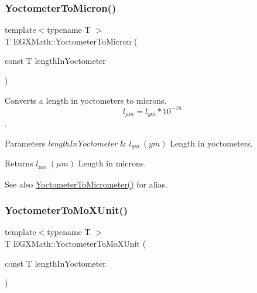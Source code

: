 \subsubsection{\texorpdfstring{Yoctometer\+To\+Micron()}{YoctometerToMicron()}}
{\footnotesize\ttfamily template$<$typename T $>$ \\
T E\+G\+X\+Math\+::\+Yoctometer\+To\+Micron (\begin{DoxyParamCaption}\item[{const T}]{length\+In\+Yoctometer }\end{DoxyParamCaption})}



Converts a length in yoctometers to microns. \[ l_{\mu m}=l_{ym} * 10^{-18} \]. 


\begin{DoxyParams}{Parameters}
{\em length\+In\+Yoctometer} & $ l_{ym}\ (ym)$ Length in yoctometers. \\
\hline
\end{DoxyParams}
\begin{DoxyReturn}{Returns}
$ l_{\mu m}\ (\mu m)$ Length in microns. 
\end{DoxyReturn}
\begin{DoxySeeAlso}{See also}
\mbox{\hyperlink{group___e_g_x_math-_conversions-_length_conversions-_yoctometer-_s_i_ga910145f68803fbaa87afd1d30d48c96e}{Yoctometer\+To\+Micrometer()}} for alias. 
\end{DoxySeeAlso}
\mbox{\label{group___e_g_x_math-_conversions-_length_conversions-_yoctometer-_non-_s_i_ga6a6a1fb3ecc97e377fc728c03327048e}} 
\subsubsection{\texorpdfstring{Yoctometer\+To\+Mo\+X\+Unit()}{YoctometerToMoXUnit()}}
{\footnotesize\ttfamily template$<$typename T $>$ \\
T E\+G\+X\+Math\+::\+Yoctometer\+To\+Mo\+X\+Unit (\begin{DoxyParamCaption}\item[{const T}]{length\+In\+Yoctometer }\end{DoxyParamCaption})}



